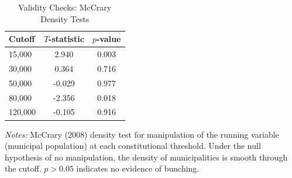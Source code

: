 \begin{table}[htbp]
\centering
\caption{Validity Checks: McCrary Density Tests}
\label{tab:validity}
\begin{tabular}{lcc}
\toprule
Cutoff & $T$-statistic & $p$-value \\
\midrule
15,000 & 2.940 & 0.003 \\
30,000 & 0.364 & 0.716 \\
50,000 & -0.029 & 0.977 \\
80,000 & -2.356 & 0.018 \\
120,000 & -0.105 & 0.916 \\
\bottomrule
\end{tabular}
\begin{tablenotes}[flushleft]\small
\item \textit{Notes:} McCrary (2008) density test for manipulation of the running variable (municipal population) at each constitutional threshold. Under the null hypothesis of no manipulation, the density of municipalities is smooth through the cutoff. $p > 0.05$ indicates no evidence of bunching.
\end{tablenotes}
\end{table}

